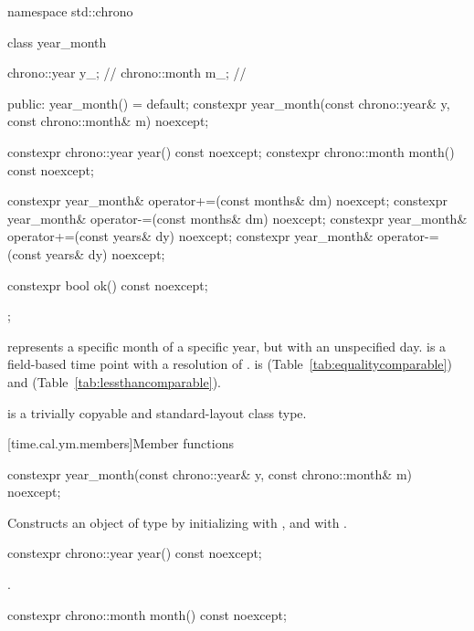 \begin{codeblock}
namespace std::chrono {
  class year_month {
    chrono::year  y_;           // \expos
    chrono::month m_;           // \expos

  public:
    year_month() = default;
    constexpr year_month(const chrono::year& y, const chrono::month& m) noexcept;

    constexpr chrono::year  year()  const noexcept;
    constexpr chrono::month month() const noexcept;

    constexpr year_month& operator+=(const months& dm) noexcept;
    constexpr year_month& operator-=(const months& dm) noexcept;
    constexpr year_month& operator+=(const years& dy)  noexcept;
    constexpr year_month& operator-=(const years& dy)  noexcept;

    constexpr bool ok() const noexcept;
  };
}
\end{codeblock}

\pnum
{} represents a specific month of a specific year,
but with an unspecified day.
 is a field-based time point with a resolution of .
 is  (Table~\ref{tab:equalitycomparable})
and  (Table~\ref{tab:lessthancomparable}).

\pnum
{} is a trivially copyable and standard-layout class type.

[time.cal.ym.members]{Member functions}

%
\begin{itemdecl}
constexpr year_month(const chrono::year& y, const chrono::month& m) noexcept;
\end{itemdecl}

\begin{itemdescr}
\pnum
\effects
Constructs an object of type  by
initializing  with , and  with .
\end{itemdescr}

%
\begin{itemdecl}
constexpr chrono::year year() const noexcept;
\end{itemdecl}

\begin{itemdescr}
\pnum
\returns {}.
\end{itemdescr}

%
\begin{itemdecl}
constexpr chrono::month month() const noexcept;
\end{itemdecl}

